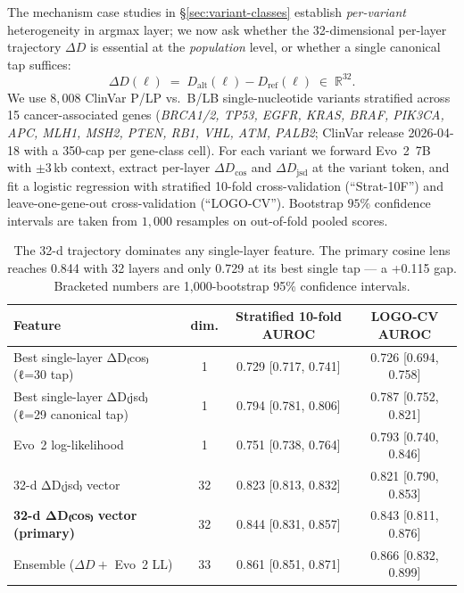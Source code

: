\documentclass[12pt]{article}
\renewenvironment{table*}{\begin{table}}{\end{table}}
\theoremstyle{plain}
\theoremstyle{definition}
\theoremstyle{remark}
\newcommand{\DDcos}{\Delta D_{\cos}}
\newcommand{\DDjsd}{\Delta D_{\mathrm{jsd}}}
\begin{document}
The mechanism case studies in \S\ref{sec:variant-classes} establish
\emph{per-variant} heterogeneity in argmax layer; we now ask whether
the 32-dimensional per-layer trajectory $\Delta D$ is essential at the
\emph{population} level, or whether a single canonical tap suffices:
\begin{equation}
  \Delta D(\ell) \;=\; D_{\mathrm{alt}}(\ell) - D_{\mathrm{ref}}(\ell)
  \;\in\;\mathbb{R}^{32}.
  \label{eq:DD}
\end{equation}
We use $8{,}008$ ClinVar P/LP vs.\ B/LB single-nucleotide variants
stratified across 15 cancer-associated genes (\emph{BRCA1/2, TP53,
EGFR, KRAS, BRAF, PIK3CA, APC, MLH1, MSH2, PTEN, RB1, VHL, ATM, PALB2};
ClinVar release 2026-04-18 with a 350-cap per gene-class cell). For
each variant we forward Evo~2~7B with $\pm 3$\,kb context, extract
per-layer $\DDcos$ and $\DDjsd$ at the variant token, and fit a
logistic regression with stratified 10-fold cross-validation
(``Strat-10F'') and leave-one-gene-out cross-validation (``LOGO-CV'').
Bootstrap $95\%$ confidence intervals are taken from $1{,}000$
resamples on out-of-fold pooled scores.

\begin{table}[t]
\caption{The 32-d trajectory dominates any single-layer feature. The
primary cosine lens reaches 0.844 with 32 layers and only 0.729 at
its best single tap --- a +0.115 gap. Bracketed numbers are
1,000-bootstrap 95\% confidence intervals.}
\label{tab:auroc}
\centering
\small
\begin{tabular}{@{}lccc@{}}
\toprule
Feature & dim. & Stratified 10-fold AUROC & LOGO-CV AUROC \\
\midrule
Best single-layer ΔD₍cos₎ (ℓ=30 tap) & 1
   & 0.729 [0.717, 0.741]
   & 0.726 [0.694, 0.758] \\
Best single-layer ΔD₍jsd₎ (ℓ=29 canonical tap) & 1
   & 0.794 [0.781, 0.806]
   & 0.787 [0.752, 0.821] \\
Evo~2 log-likelihood & 1
   & 0.751 [0.738, 0.764]
   & 0.793 [0.740, 0.846] \\
32-d ΔD₍jsd₎ vector & 32
   & 0.823 [0.813, 0.832]
   & 0.821 [0.790, 0.853] \\
\textbf{32-d ΔD₍cos₎ vector (primary)} & 32
   & 0.844 [0.831, 0.857]
   & 0.843 [0.811, 0.876] \\
Ensemble ($\Delta D + $ Evo~2 LL) & 33
   & 0.861 [0.851, 0.871]
   & 0.866 [0.832, 0.899] \\
\bottomrule
\end{tabular}
\end{table}
\end{document}
